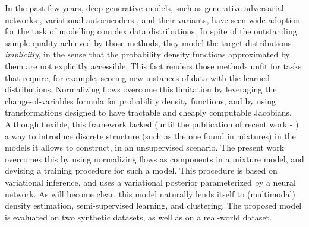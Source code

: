 In the past few years, deep generative models, such as generative adversarial networks
\autocite{GAN}, variational autoencoders \autocite{vaepaper}, and their variants,
have seen wide adoption for the task of modelling complex data distributions.
In spite of the outstanding sample quality achieved by those methods,
they model the target distributions \emph{implicitly}, in the sense that the probability
density functions approximated by them are not explicitly accessible. This fact renders those methods unfit for
tasks that require, for example, scoring new instances of data with the learned
distributions. Normalizing flows overcome this limitation by leveraging the
change-of-variables formula for probability density functions, and by using
transformations designed to have tractable and cheaply computable Jacobians. Although
flexible, this framework lacked (until the publication of recent work -
\autocites{semisuplearning_nflows, RAD}) a way to introduce discrete
structure (such as the one found in mixtures) in the models it allows to
construct, in an unsupervised scenario. The present work overcomes this by using normalizing flows as components in a mixture model,
and devising a training procedure for such a model.
This procedure is based on variational inference, and uses a variational posterior
parameterized by a neural network. As will become clear, this model naturally
lends itself to (multimodal) density estimation, semi-supervised learning, and
clustering. The proposed model is evaluated on two synthetic datasets, as well
as on a real-world dataset.
